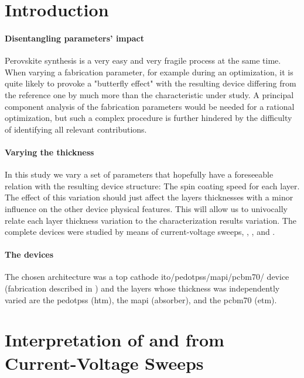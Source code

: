 

\section{Introduction}

	\paragraph{Disentangling parameters' impact} Perovskite synthesis is a very easy and very fragile process at the same time. When varying a fabrication parameter, for example during an optimization, it is quite likely to provoke a "butterfly effect" with the resulting device differing from the reference one by much more than the characteristic under study. A principal component analysis of the fabrication parameters would be needed for a rational optimization, but such a complex procedure is further hindered by the difficulty of identifying all relevant contributions.

	\paragraph{Varying the thickness} In this study we vary a set of parameters that hopefully have a foreseeable relation with the resulting device structure: The spin coating speed for each layer. The effect of this variation should just affect the layers thicknesses with a minor influence on the other device physical features. This will allow us to univocally relate each layer thickness variation to the characterization results variation. The complete devices were studied by means of current-voltage sweeps, , , and .

	\paragraph{The devices} The chosen architecture was a top cathode \gls{ito}\-/\gls{pedotpss}\-/\gls{mapi}\-/\gls{pcbm70}\-/ device (fabrication described in ) and the layers whose thickness was independently varied are the \gls{pedotpss} (\gls{htm}), the \gls{mapi} (absorber), and the \gls{pcbm70} (\gls{etm}).

\section{Interpretation of  and  from Current-Voltage Sweeps}

